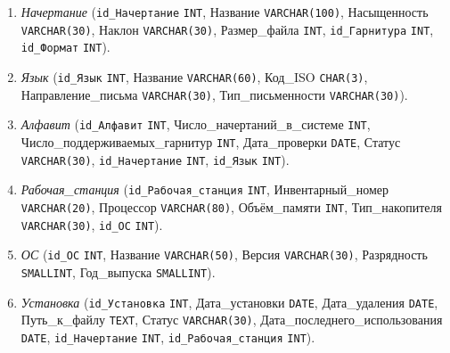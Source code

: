 \begin{enumerate}
    \item \textit{Начертание} (\texttt{id_Начертание} \texttt{INT},
    Название \texttt{VARCHAR(100)},
    Насыщенность \texttt{VARCHAR(30)},
    Наклон \texttt{VARCHAR(30)},
    Размер\_файла \texttt{INT},
    \texttt{id_Гарнитура} \texttt{INT},
    \texttt{id_Формат} \texttt{INT}).

    \item \textit{Язык} (\texttt{id_Язык} \texttt{INT},
    Название \texttt{VARCHAR(60)},
    Код\_ISO \texttt{CHAR(3)},
    Направление\_письма \texttt{VARCHAR(30)},
    Тип\_письменности \texttt{VARCHAR(30)}).

    \item \textit{Алфавит} (\texttt{id_Алфавит} \texttt{INT},
    Число\_начертаний\_в\_системе \texttt{INT},
    Число\_поддерживаемых\_гарнитур \texttt{INT},
    Дата\_проверки \texttt{DATE},
    Статус \texttt{VARCHAR(30)},
    \texttt{id_Начертание} \texttt{INT},
    \texttt{id_Язык} \texttt{INT}).

    \item \textit{Рабочая\_станция} (\texttt{id_Рабочая_станция} \texttt{INT},
    Инвентарный\_номер \texttt{VARCHAR(20)},
    Процессор \texttt{VARCHAR(80)},
    Объём\_памяти \texttt{INT},
    Тип\_накопителя \texttt{VARCHAR(30)},
    \texttt{id_ОС} \texttt{INT}).

    \item \textit{ОС} (\texttt{id_ОС} \texttt{INT},
    Название \texttt{VARCHAR(50)},
    Версия \texttt{VARCHAR(30)},
    Разрядность \texttt{SMALLINT},
    Год\_выпуска \texttt{SMALLINT}).

    \item \textit{Установка} (\texttt{id_Установка} \texttt{INT},
    Дата\_установки \texttt{DATE},
    Дата\_удаления \texttt{DATE},
    Путь\_к\_файлу \texttt{TEXT},
    Статус \texttt{VARCHAR(30)},\newline
    Дата\_последнего\_использования \texttt{DATE},
    \texttt{id_Начертание} \texttt{INT},
    \texttt{id_Рабочая_станция} \texttt{INT}).
\end{enumerate}

